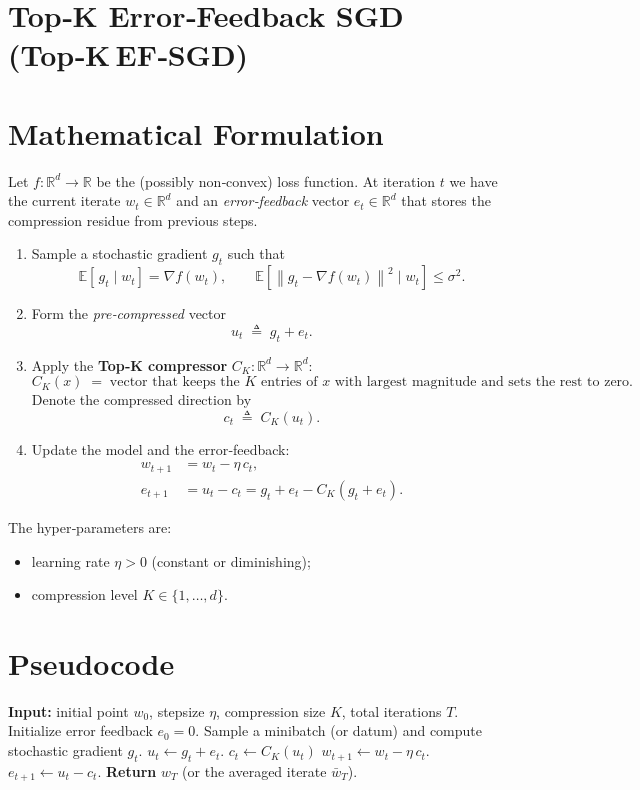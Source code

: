 \documentclass{article}
\newcommand{\EE}{\mathbb{E}}
\newcommand{\RR}{\mathbb{R}}
\newcommand{\norm}[1]{\left\lVert #1 \right\rVert}
\begin{document}
\section*{Top‑K Error‑Feedback SGD (Top‑K EF‑SGD)}

\section*{Mathematical Formulation}
Let $f:\RR^{d}\to\RR$ be the (possibly non‑convex) loss function.  
At iteration $t$ we have the current iterate $w_t\in\RR^{d}$ and an \emph{error‑feedback} vector $e_t\in\RR^{d}$ that stores the compression residue from previous steps.  

\begin{enumerate}[label=\arabic*)]
    \item Sample a stochastic gradient $g_t$ such that
    \[
        \EE\!\left[\,g_t\mid w_t\right]=\nabla f(w_t),\qquad 
        \EE\!\left[\norm{g_t-\nabla f(w_t)}^{2}\mid w_t\right]\le\sigma^{2}. 
    \]
    \item Form the \emph{pre‑compressed} vector
    \[
        u_t \;\triangleq\; g_t+e_t .
    \]
    \item Apply the \textbf{Top‑K compressor} $C_{K}:\RR^{d}\to\RR^{d}$:
    \[
        C_{K}(x)\;=\;\text{vector that keeps the $K$ entries of $x$ with largest magnitude and sets the rest to zero.}
    \]
    Denote the compressed direction by
    \[
        c_t \;\triangleq\; C_{K}(u_t).
    \]
    \item Update the model and the error‑feedback:
    \[
    \boxed{
    \begin{aligned}
        w_{t+1} &= w_t - \eta\,c_t, \\
        e_{t+1} &= u_t - c_t = g_t+e_t-C_{K}(g_t+e_t).
    \end{aligned}}
    \]
\end{enumerate}
The hyper‑parameters are:
\begin{itemize}
    \item learning rate $\eta>0$ (constant or diminishing);
    \item compression level $K\in\{1,\dots,d\}$.
\end{itemize}

\section*{Pseudocode}
\begin{algorithm}[H]
\caption{Top‑K EF‑SGD}
\begin{algorithmic}[1]
\STATE \textbf{Input:} initial point $w_{0}$, stepsize $\eta$, compression size $K$, total iterations $T$.
\STATE Initialize error feedback $e_{0}=0$.
    \STATE Sample a minibatch (or datum) and compute stochastic gradient $g_{t}$.
    \STATE $u_{t}\gets g_{t}+e_{t}$.
    \STATE $c_{t}\gets C_{K}(u_{t})$ \hfill{}
    \STATE $w_{t+1}\gets w_{t}-\eta\,c_{t}$.
    \STATE $e_{t+1}\gets u_{t}-c_{t}$.
\ENDFOR
\STATE \textbf{Return} $w_{T}$ (or the averaged iterate $\bar w_T$).
\end{algorithmic}
\end{algorithm}
\end{document}
